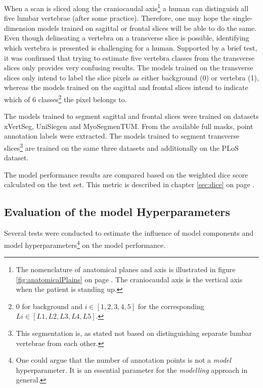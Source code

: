\par{
    When a scan is sliced along the craniocaudal axis\footnote{
        The nomenclature of anatomical planes and axis is illustrated in figure \ref{fig:anatomicalPlains} on page \pageref{fig:anatomicalPlains}.
        The craniocaudal axis is the vertical axis when the patient is standing up.} 
    a human can distinguish all five lumbar vertebrae (after some practice).
    Therefore, one may hope the single-dimension models trained on sagittal or frontal slices will be able to do the same.
    Even though delineating a vertebra on a transverse slice is possible, identifying which vertebra is presented is challenging for a human.
    Supported by a brief test, it was confirmed that trying to estimate five vertebra classes from the transverse slices only provides very confusing results.
    The models trained on the transverse slices only intend to label the slice pixels as either background (0) or vertebra (1), 
    whereas the models trained on the sagittal and frontal slices intend to indicate which of 6 classes\footnote{0 for background and $i\in [1,2,3,4,5]$ for the corresponding $L i \in [L1,L2, L3, L4, L5]$.} the pixel belongs to.
}
\par{
    The models trained to segment sagittal and frontal slices were trained on datasets xVertSeg, UniSiegen and MyoSegmenTUM.
    From the available full masks, point annotation labels were extracted.
    The models trained to segment transverse slices\footnote{This segmentation is, as stated not based on distinguishing separate lumbar vertebrae from each other.} 
    are trained on the same three datasets and additionally on the PLoS dataset.    
}
\par{
    The model performance results are compared based on the weighted dice score calculated on the test set.
    This metric is described in chapter \ref{sec:dice} on page \pageref{sec:dice}.
}
\subsection{Evaluation of the model Hyperparameters}
\par{
    Several tests were conducted to estimate the influence of model components and model hyperparameters\footnote{
        One could argue that the number of annotation points is not a \textit{model} hyperparameter. It is an essential parameter for the \textit{modelling} approach in general.
    } on the model performance.
}
